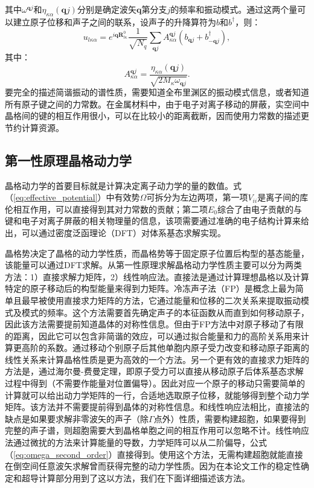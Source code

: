 其中$\omega^{\bm{q}j}$和$\eta_{\kappa\alpha}(\bm{q}j)$分别是确定波矢$\bm{q}$第分支$j$的频率和振动模式。通过这两个量可以建立原子位移和声子之间的联系，设声子的升降算符为$b$和$b^{\dagger}$，则：
\begin{equation}
  u_{l\kappa\alpha} = e^{i\bm{q}\bm{R}^0_{l\kappa}}\frac{1}{\sqrt{N_q}} \sum_{\bm{q}j} A^{\bm{q}j}_{\kappa\alpha}(b_{\bm{q}j} + b^{\dagger}_{-\bm{q}j}),
\end{equation}
其中：
\begin{equation}
  A^{\bm{q}j}_{\kappa\alpha} = \frac{\eta_{\kappa\alpha}(\bm{q}j)}{\sqrt{2M_\kappa \omega_{\bm{q}j}}}.
\end{equation}
要完全的描述简谐振动的谱性质，需要知道全布里渊区的振动模式信息，或者知道所有原子键之间的力常数。在金属材料中，由于电子对离子移动的屏蔽，实空间中晶格间的键的相互作用很小，可以在比较小的距离截断，因而使用力常数的描述更节约计算资源。

\subsection{第一性原理晶格动力学}
晶格动力学的首要目标就是计算决定离子动力学的量的数值。式（\ref{eq:effective_potential}）中有效势$\Omega$可拆分为左边两项，第一项$V_{ii}$是离子间的库伦相互作用，可以直接得到其对力常数的贡献；第二项$E_0$综合了由电子贡献的与键和电子对离子屏蔽的相关物理量的信息，该项需要通过准确的电子结构计算来给出，可以通过密度泛函理论（DFT）对体系基态求解实现。

晶格势决定了晶格的动力学性质，而晶格势等于固定原子位置后构型的基态能量，该能量可以通过DFT求解。从第一性原理求解晶格动力学性质主要可以分为两类方法\cite{fritsch1999density}：1）直接求解力矩阵，2）线性响应法。直接法是通过计算理想晶格以及计算特定的原子移动后的构型能量来得到力矩阵。冷冻声子法（FP）是概念上最为简单且最早被使用直接求力矩阵的方法，它通过能量和位移的二次关系来提取振动模式及模式的频率\cite{yin1980microscopic}。这个方法需要首先确定声子的本征函数从而直到如何移动原子，因此该方法需要提前知道晶体的对称性信息。但由于FP方法中对原子移动了有限的距离，因此它可以包含非简谐的效应，可以通过拟合能量和力的高阶关系用来计算更高阶的系数。通过移动个别原子后其他单胞内原子受力改变和移动原子距离的线性关系来计算晶格性质是更为高效的一个方法。另一个更有效的直接求力矩阵的方法是，通过海尔曼-费曼定理，即原子受力可以直接从移动原子后体系基态求解过程中得到（不需要作能量对位置偏导）。因此对应一个原子的移动只需要简单的计算就可以给出动力学矩阵的一行，合适地选取原子位移，就能够得到整个动力学矩阵。该方法并不需要提前得到晶体的对称性信息。和线性响应法相比，直接法的缺点是如果要求解非零波矢的声子（除$\Gamma$点外）性质，需要构建超胞，如果要得到完整的声子谱，则超胞需要大到晶格单胞之间的相互作用可以忽略不计\cite{frank1995ab,kresse1995ab}。线性响应法通过微扰的方法来计算能量的导数，力学矩阵可以从二阶偏导，公式（\ref{eq:omega_second_order}）直接得到。使用这个方法，无需构建超胞就能直接在倒空间任意波矢求解曾而获得完整的动力学性质\cite{baroni2001phonons}。因为在本论文工作的稳定性确定和超导计算部分用到了这以方法，我们在下面详细描述该方法。

